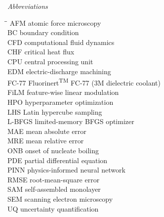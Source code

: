 \noindent\textit{Abbreviations}
\begin{tabbing}
\hspace{2.4cm}\=\hspace{10cm}\=\kill
AFM   \> atomic force microscopy \\
BC    \> boundary condition \\
CFD   \> computational fluid dynamics \\
CHF   \> critical heat flux \\
CPU   \> central processing unit \\
EDM   \> electric-discharge machining \\
FC-77 \> Fluorinert\textsuperscript{TM} FC-77 (3M dielectric coolant) \\
FiLM  \> feature-wise linear modulation \\
HPO   \> hyperparameter optimization \\
LHS   \> Latin hypercube sampling \\
L-BFGS\> limited-memory BFGS optimizer \\
MAE   \> mean absolute error \\
MRE   \> mean relative error \\
ONB   \> onset of nucleate boiling \\
PDE   \> partial differential equation \\
PINN  \> physics-informed neural network \\
RMSE  \> root-mean-square error \\
SAM   \> self-assembled monolayer \\
SEM   \> scanning electron microscopy \\
UQ    \> uncertainty quantification \\
\end{tabbing}
